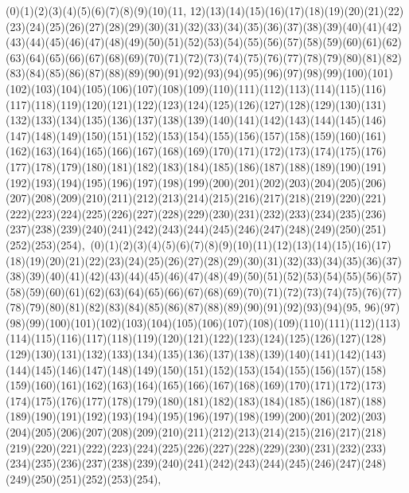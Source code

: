 \documentclass[12pt]{article}
\begin{document}
{(0)(1)(2)(3)(4)(5)(6)(7)(8)(9)(10)(11, 12)(13)(14)(15)(16)(17)(18)(19)(20)(21)(22)(23)(24)(25)(26)(27)(28)(29)(30)(31)(32)(33)(34)(35)(36)(37)(38)(39)(40)(41)(42)(43)(44)(45)(46)(47)(48)(49)(50)(51)(52)(53)(54)(55)(56)(57)(58)(59)(60)(61)(62)(63)(64)(65)(66)(67)(68)(69)(70)(71)(72)(73)(74)(75)(76)(77)(78)(79)(80)(81)(82)(83)(84)(85)(86)(87)(88)(89)(90)(91)(92)(93)(94)(95)(96)(97)(98)(99)(100)(101)(102)(103)(104)(105)(106)(107)(108)(109)(110)(111)(112)(113)(114)(115)(116)(117)(118)(119)(120)(121)(122)(123)(124)(125)(126)(127)(128)(129)(130)(131)(132)(133)(134)(135)(136)(137)(138)(139)(140)(141)(142)(143)(144)(145)(146)(147)(148)(149)(150)(151)(152)(153)(154)(155)(156)(157)(158)(159)(160)(161)(162)(163)(164)(165)(166)(167)(168)(169)(170)(171)(172)(173)(174)(175)(176)(177)(178)(179)(180)(181)(182)(183)(184)(185)(186)(187)(188)(189)(190)(191)(192)(193)(194)(195)(196)(197)(198)(199)(200)(201)(202)(203)(204)(205)(206)(207)(208)(209)(210)(211)(212)(213)(214)(215)(216)(217)(218)(219)(220)(221)(222)(223)(224)(225)(226)(227)(228)(229)(230)(231)(232)(233)(234)(235)(236)(237)(238)(239)(240)(241)(242)(243)(244)(245)(246)(247)(248)(249)(250)(251)(252)(253)(254)$
, 
$
(0)(1)(2)(3)(4)(5)(6)(7)(8)(9)(10)(11)(12)(13)(14)(15)(16)(17)(18)(19)(20)(21)(22)(23)(24)(25)(26)(27)(28)(29)(30)(31)(32)(33)(34)(35)(36)(37)(38)(39)(40)(41)(42)(43)(44)(45)(46)(47)(48)(49)(50)(51)(52)(53)(54)(55)(56)(57)(58)(59)(60)(61)(62)(63)(64)(65)(66)(67)(68)(69)(70)(71)(72)(73)(74)(75)(76)(77)(78)(79)(80)(81)(82)(83)(84)(85)(86)(87)(88)(89)(90)(91)(92)(93)(94)(95, 96)(97)(98)(99)(100)(101)(102)(103)(104)(105)(106)(107)(108)(109)(110)(111)(112)(113)(114)(115)(116)(117)(118)(119)(120)(121)(122)(123)(124)(125)(126)(127)(128)(129)(130)(131)(132)(133)(134)(135)(136)(137)(138)(139)(140)(141)(142)(143)(144)(145)(146)(147)(148)(149)(150)(151)(152)(153)(154)(155)(156)(157)(158)(159)(160)(161)(162)(163)(164)(165)(166)(167)(168)(169)(170)(171)(172)(173)(174)(175)(176)(177)(178)(179)(180)(181)(182)(183)(184)(185)(186)(187)(188)(189)(190)(191)(192)(193)(194)(195)(196)(197)(198)(199)(200)(201)(202)(203)(204)(205)(206)(207)(208)(209)(210)(211)(212)(213)(214)(215)(216)(217)(218)(219)(220)(221)(222)(223)(224)(225)(226)(227)(228)(229)(230)(231)(232)(233)(234)(235)(236)(237)(238)(239)(240)(241)(242)(243)(244)(245)(246)(247)(248)(249)(250)(251)(252)(253)(254)$
, 
$
}
\end{document}

